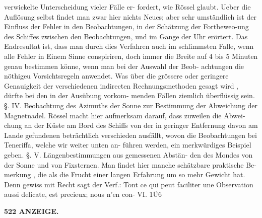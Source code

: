 \documentclass[12pt,a4paper]{article}
\begin{document}
verwickelte  Unterscheidung  vieler  Fälle  er- fordert, wie  Rössel  glaubt.     Ueber  die  Auflösung  selbst  findet  man  zwar  hier  nichts  Neues;   aber  sehr umständlich  ist  der  Einfluss  der  Fehler  in  den  Beobachtungen,  in  der  Schätzung  der  Fortbeweo-ung  des Schiffes  zwischen  den  Beobachtungen,  und  im  Gange  der  Uhr  erörtert.     Das  Endresultat  ist,    dass  man durch  dies  Verfahren  auch  im  schlimmsten  Falle,   wenn   alle  Fehler  in  Einem  Sinne  conspiriren,   doch immer  die  Breite  auf  4  bis  5  Minuten  genau  bestimmen  könne,    wenn  man  bei  der  Auswahl  der  Beob- achtungen die  nöthigeu  Vorsichtsregeln  anwendet.     Was  über  die  grössere   oder  geringere  Genauigkeit der  verschiedenen  indirecten  Rechnungsmethoden  gesagt  wird ,  dürfte  bei  den  in  der  Ausübung  vorkom- menden Fällen  ziemlich  überflüssig  sein.     §.  IV.  Beobachtung  des  Azimuths  der  Sonne  zur  Bestimmung der  Abweichung  der  Magnetnadel.     Rössel  macht  hier   aufmerksam  darauf,   dass   zuweilen  die  Abwei- chung an  der  Küste    am  Bord  des  Schiffs  von  der  in  geringer  Entfernung  davon  am  Lande  gefundenen beträchtlich  verschieden  ausfällt,  wovon  die  Beobachtungen  bei  Teneriffa,  welche  wir  weiter  unten  an- führen werden,  ein  merkwürdiges  Beispiel  geben.     §.  V.  Längenbestimmungen  aus  gemessenen  Abstän- den des  Mondes  von  der  Sonne  und  von  Fixsternen.    Man  findet  hier  manche  schätzbare  praktische  Be- merkung ,  die  als  die  Frucht  einer  langen  Erfahrung  um  so  mehr  Gewicht  hat.     Denn  gewiss  mit  Recht sagt  der  Verf.:  Tont  ce  qui  peut  faciliter  une  Observation  aussi  delicate,  est  precieux;   nous  n'en    con- VI.  1Ü6

\vspace{0.5em}


\noindent\textbf{522  ANZEIGE.}
\end{document}
